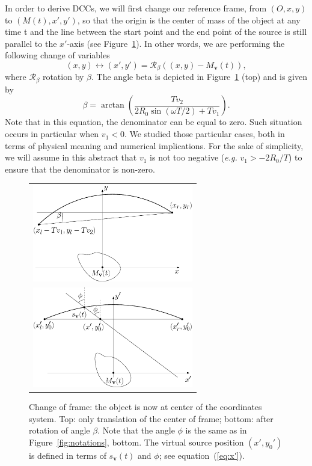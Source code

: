 \documentclass[twocolumn]{IEEEtran}
\newcommand{\Mbv}{M_{\mathbf{v}}}
\newcommand{\sbv}{s_{\mathbf{v}}}
\begin{document}
In order to derive DCCs, we will first change our reference frame, from $\left(O, x, y\right)$ to $\left(M(t), x', y'\right)$, so that the origin is the center of mass of the object at any time t and the line between the start point and the end point of the source is still parallel to the $x'$-axis (see Figure~\ref{fig:change_frame}). In other words, we are performing the following change of variables
\begin{equation}
	(x,y) \leftrightarrow (x',y') = \mathcal{R}_{\beta} \left( (x,y)-\Mbv(t) \right),
\end{equation}
where $\mathcal{R}_{\beta}$ rotation by $\beta$. The angle beta is depicted in Figure~\ref{fig:change_frame} (top) and is given by
\begin{equation}
	\beta = \arctan \left( \frac{T v_2}{2R_0 \sin(\omega T/2) + T v_1} \right).
\end{equation}
Note that in this equation, the denominator can be equal to zero. Such situation occurs in particular when $v_1 < 0$. We studied those particular cases, both in terms of physical meaning and numerical implications. For the sake of simplicity, we will assume in this abstract that $v_1$ is not too negative (\emph{e.g.} $v_1 > - 2 R_0 / T$) to ensure that the denominator is non-zero.

\begin{figure}[!ht]
	\centering
	\begin{tabular}{c}
	\includegraphics[width=70mm]{figs/frame_object_before_rotation.eps} \\
	\includegraphics[width=70mm]{figs/frame_object.eps}
	\end{tabular}
	\caption{Change of frame: the object is now at center of the coordinates system. Top: only translation of the center of frame; bottom: after rotation of angle $\beta$. Note that the angle $\phi$ is the same as in Figure~\ref{fig:notations}, bottom. The virtual source position $(x',y_0')$ is defined in terms of $\sbv(t)$ and $\phi$; see equation~(\ref{eq:x'}).\label{fig:change_frame}}
\end{figure}
\end{document}
